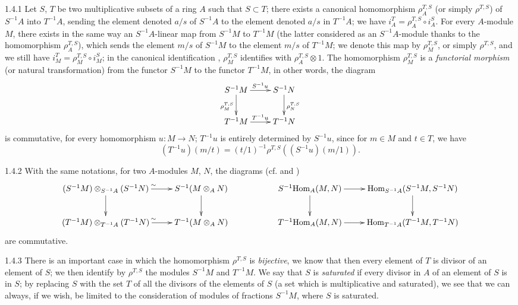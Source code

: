 \begin{env}{1.4.1}
\label{env-0.1.4.1}
Let $S$, $T$ be two multiplicative subsets of a ring $A$ such that $S\subset T$; there exists
a canonical homomorphism $\rho_A^{T,S}$ (or simply $\rho^{T,S}$) of $S^{-1}A$ into $T^{-1}A$,
sending the element denoted $a/s$ of $S^{-1}A$ to the element denoted $a/s$ in $T^{-1}A$; we
have ${i_A^T=\rho_A^{T,S}\circ i_A^S}$. For every $A$-module $M$, there exists in the same
way an $S^{-1}A$-linear map from $S^{-1}M$ to $T^{-1}M$ (the latter considered as an
$S^{-1}A$-module thanks to the homomorphism $\rho_A^{T,S}$), which sends the element $m/s$ of
$S^{-1}M$ to the element $m/s$ of $T^{-1}M$; we denote this map by $\rho_M^{T,S}$, or simply
$\rho^{T,S}$, and we still have $i_M^T=\rho_M^{T,S}\circ i_M^S$; in the canonical
identification , $\rho_M^{T,S}$ identifies with $\rho_A^{T,S}\otimes 1$. The
homomorphism $\rho_M^{T,S}$ is a \emph{functorial morphism} (or natural transformation) from
the functor $S^{-1}M$ to the functor $T^{-1}M$, in other words, the diagram
\[
  \xymatrix{
  S^{-1}M\ar[r]^{S^{-1}u}\ar[d]_{\rho_M^{T,S}} & S^{-1}N\ar[d]^{\rho_N^{T,S}}\\
  T^{-1}M\ar[r]^{T^{-1}u} & T^{-1}N
  }
\]
is commutative, for every homomorphism $u:M\to N$; $T^{-1}u$ is entirely determined by
$S^{-1}u$, since for $m\in M$ and $t\in T$, we have
\[
  (T^{-1}u)(m/t)=(t/1)^{-1}\rho^{T,S}((S^{-1}u)(m/1)).
\]
\end{env}

\begin{env}{1.4.2}
\label{env-0.1.4.2}
With the same notations, for two $A$-modules $M$, $N$, the diagrams (cf. 
and )
\[
  \xymatrix{
    (S^{-1}M)\otimes_{S^{-1}A}(S^{-1}N)\ar[r]^\sim \ar[d] & S^{-1}(M\otimes_A N)\ar[d] & &
    S^{-1}\Hom_A(M,N)\ar[r]\ar[d] & \Hom_{S^{-1}A}(S^{-1}M,S^{-1}N)\ar[d]\\
    (T^{-1}M)\otimes_{T^{-1}A}(T^{-1}N)\ar[r]^\sim & T^{-1}(M\otimes_A N) & &
    T^{-1}\Hom_A(M,N)\ar[r] & \Hom_{T^{-1}A}(T^{-1}M,T^{-1}N)
  }
\]
are commutative.
\end{env}

\begin{env}{1.4.3}
\label{env-0.1.4.3}
There is an important case in which the homomorphism $\rho^{T,S}$ is \emph{bijective},
we know that then every element of $T$ is divisor of an element of $S$; we then identify by
$\rho^{T,S}$ the modules $S^{-1}M$ and $T^{-1}M$. We say that $S$ is \emph{saturated} if
every divisor in $A$ of an element of $S$ is in $S$; by replacing $S$ with  the set $T$ of
all the divisors of the elements of $S$ (a set which is multiplicative and saturated), we see
that we can always, if we wish, be limited to the consideration of modules of fractions
$S^{-1}M$, where $S$ is saturated.
\end{env}

